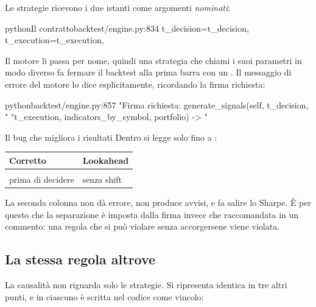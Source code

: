 Le strategie ricevono i due istanti come argomenti \emph{nominati}:

\begin{codiceInterno}{python}{Il contratto}{backtest/engine.py:834}
                        t_decision=t_decision,
                        t_execution=t_execution,
\end{codiceInterno}

\noindent
Il motore li passa per nome, quindi una strategia che chiami i suoi parametri
in modo diverso fa fermare il backtest alla prima barra con un
. Il messaggio di errore del motore lo dice esplicitamente,
ricordando la firma richiesta:

\begin{codiceInterno}{python}{}{backtest/engine.py:857}
                            "Firma richiesta: generate_signals(self, t_decision, "
                            "t_execution, indicators_by_symbol, portfolio) -> "
\end{codiceInterno}

\begin{attenzione}{Il bug che migliora i risultati}
Dentro  si legge solo fino a :

\begin{center}
\begin{tabular}{@{}L{62mm}L{76mm}@{}}
\toprule
\textbf{Corretto} & \textbf{Lookahead} \\
\midrule
{} &  \\
 prima di decidere &  senza shift \\
\bottomrule
\end{tabular}
\end{center}

\noindent
La seconda colonna non dà errore, non produce avvisi, e fa salire lo Sharpe.
È per questo che la separazione è imposta dalla firma invece che raccomandata
in un commento: una regola che si può violare senza accorgersene viene
violata.
\end{attenzione}

\subsection{La stessa regola altrove}

La causalità non riguarda solo le strategie. Si ripresenta identica in tre
altri punti, e in ciascuno è scritta nel codice come vincolo:


